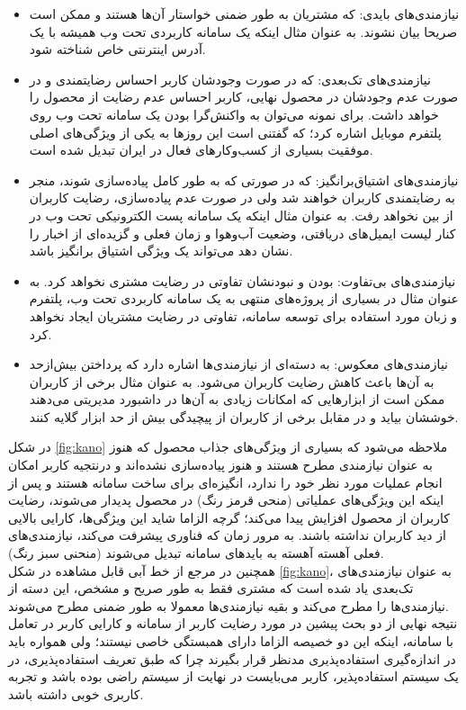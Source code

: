 \begin{itemize}
	\item 
	نیازمندی‌های بایدی: که مشتریان به طور ضمنی خواستار آن‌ها هستند و ممکن است صریحا بیان نشوند. به عنوان مثال اینکه یک سامانه کاربردی تحت وب همیشه با یک آدرس اینترنتی خاص
	شناخته شود.
	\item
	نیازمندی‌های تک‌بعدی: که در صورت وجودشان کاربر احساس رضایتمندی و در صورت عدم وجودشان در محصول نهایی، کاربر احساس عدم رضایت از محصول را خواهد داشت. برای نمونه می‌توان به واکنش‌گرا بودن یک سامانه تحت وب روی پلتفرم موبایل اشاره کرد؛ که گفتنی است این روزها به یکی از ویژگی‌های اصلی موفقیت بسیاری از کسب‌وکارهای فعال در ایران تبدیل شده است.
	\item 
	نیازمندی‌های اشتیاق‌برانگیز: که در صورتی که به طور کامل پیاده‌سازی شوند، منجر به رضایتمندی کاربران خواهند شد ولی در صورت عدم پیاده‌سازی، رضایت کاربران از بین نخواهد رفت. به عنوان مثال اینکه یک سامانه پست الکترونیکی تحت وب در کنار لیست ایمیل‌های دریافتی، وضعیت آب‌وهوا و زمان فعلی و گزیده‌ای از اخبار را نشان دهد می‌تواند یک ویژگی اشتیاق برانگیز باشد.
	\item 
	نیازمندی‌های بی‌تفاوت: بودن و نبودنشان تفاوتی در رضایت مشتری نخواهد کرد. به عنوان مثال در بسیاری از پروژه‌های منتهی به یک سامانه کاربردی تحت وب، پلتفرم و زبان مورد استفاده برای توسعه سامانه، تفاوتی در رضایت مشتریان ایجاد نخواهد کرد.
	\item 
	نیازمندی‌های معکوس: به دسته‌ای از نیازمندی‌ها اشاره دارد که پرداختن بیش‌ازحد به آن‌ها باعث کاهش رضایت کاربران می‌شود. به عنوان مثال برخی از کاربران ممکن است از ابزارهایی که امکانات زیادی به آن‌ها در داشبورد مدیریتی می‌دهند خوششان بیاید و در مقابل برخی از کاربران از پیچیدگی بیش از حد ابزار گلایه کنند.
\end{itemize}
در شکل
\ref{fig:kano}
ملاحظه می‌شود که بسیاری از ویژگی‌های جذاب محصول که هنوز به عنوان نیازمندی مطرح هستند و هنوز پیاده‌سازی نشده‌اند و درنتجیه کاربر امکان انجام عملیات مورد نظر خود را ندارد، انگیزه‌ای برای ساخت سامانه هستند و پس از اینکه این ویژگی‌های عملیاتی (منحی قرمز رنگ) در محصول پدیدار می‌شوند، رضایت کاربران از محصول افزایش پیدا می‌کند؛ گرچه الزاما شاید این ویژگی‌ها، کارایی بالایی از دید کاربران نداشته باشند. به مرور زمان که فناوری پیشرفت می‌کند، نیازمندی‌های فعلی آهسته آهسته به باید‌های سامانه تبدیل می‌شوند (منحنی سبز رنگ).\\
همچنین در مرجع
\cite{sauerwein_kano_1996}
از خط آبی قابل مشاهده در شکل
\ref{fig:kano}،
به عنوان نیازمندی‌های تک‌بعدی یاد شده است که مشتری فقط به طور صریح و مشخص، این دسته از نیازمندی‌ها را مطرح می‌کند و بقیه نیازمندی‌ها معمولا به طور ضمنی مطرح می‌شوند.\\
نتیجه نهایی از دو بحث پیشین در مورد رضایت کاربر از سامانه و کارایی کاربر در تعامل با سامانه، اینکه این دو خصیصه الزاما دارای همبستگی خاصی نیستند؛ ولی همواره باید در اندازه‌گیری استفاده‌پذیری مدنظر قرار بگیرند چرا که طبق تعریف استفاده‌پذیری، در یک سیستم استفاده‌پذیر، کاربر می‌بایست در نهایت از سیستم راضی بوده باشد و تجربه کاربری خوبی داشته باشد.
